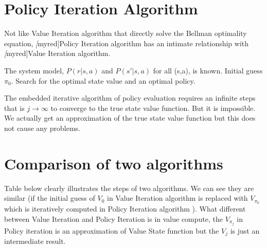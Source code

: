 \section{Policy Iteration Algorithm}
Not like Value Iteration algorithm that directly solve the Bellman optimality equation, \emph[myred]Policy Iteration algorithm has an intimate relationship with \emph[myred]{Value Iteration algorithm}.\par
\begin{algorithm}
    \caption{Policy Iteration Alogrithm}
    \KwIn The system model, $P(r|s,a)$ and $P(s'|s,a)$ for all (s,a), is known. Initial guess $\pi_0$.
    \KwOut Search for the optimal state value and an optimal policy.\par
\end{algorithm}
The embedded iterative algorithm of policy evaluation requires an infinite steps that is $j\to \infty$ to  converge to the true state value function. But it is impossible. We actually get an approximation of the true state value function but this does not cause any problems.

\section{Comparison of two algorithms}
Table below clearly illustrates the steps of two algorithms. We can see they are similar (if the initial guess of $V_{0}$ in Value Iteration algorithm is replaced with $V_{\pi_{0}}$ which is iteratively computed in Policy Iteration algorithm ). What different between Value Iteration and Policy Iteration is in value compute, the $V_{\pi_{j}}$ in Policy iteration is an approximation of Value State function but the $V_{j}$ is just an intermediate result.

